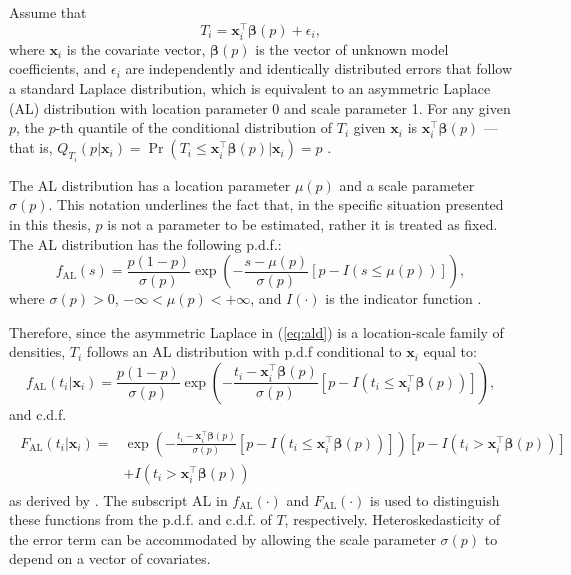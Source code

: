 Assume that
\begin{equation}
T_i = \mathbf{x}_i^\top\boldsymbol{\beta}(p) + \epsilon_i,
\label{eq:laplacemodel}
\end{equation}
where $\mathbf{x}_i$ is the covariate vector, $\boldsymbol{\beta}(p)$ is the vector of unknown model coefficients, and $\epsilon_i$ are independently and identically distributed errors that follow a standard Laplace distribution, which is equivalent to an asymmetric Laplace (AL) distribution with location parameter 0 and scale parameter 1. For any given $p$, the $p$-th quantile of the conditional distribution of $T_i$ given $\mathbf{x}_i$ is $\mathbf{x}_i^\top\boldsymbol{\beta}(p)$ --- that is, $Q_{T_i}(p|\mathbf{x}_i) = \Pr(T_i \le \mathbf{x}_i^\top\boldsymbol{\beta}(p) | \mathbf{x}_i) = p$ \citep{bottai_laplace_2010}.

The AL distribution has a location parameter $\mu(p)$ and a scale parameter $\sigma(p)$. This notation underlines the fact that, in the specific situation presented in this thesis, $p$ is not a parameter to be estimated, rather it is treated as fixed. The AL distribution has the following p.d.f.:
\begin{equation}
f_{\textrm{AL}}\left(s\right) = \frac{p\left(1-p\right)}{\sigma(p)}\exp\left(-\frac{s-\mu(p)}{\sigma(p)}\left[p-I\left(s\le\mu(p)\right)\right] \right),
\label{eq:ald}
\end{equation}
where $\sigma(p)>0$, $-\infty < \mu(p) < +\infty$, and $I(\cdot)$ is the indicator function \citep{yu_threeparameter_2005}.

Therefore, since the asymmetric Laplace in (\ref{eq:ald}) is a location-scale family of densities, $T_i$ follows an AL distribution with p.d.f conditional to $\mathbf{x}_i$ equal to:
\begin{equation}
f_{\textrm{AL}}\left(t_i|\mathbf{x}_i\right) = \frac{p\left(1-p\right)}{\sigma(p)}\exp\left(-\frac{t_i-\mathbf{x}_i^\top\boldsymbol{\beta}(p)}{\sigma(p)}\left[p-I\left(t_i\le\mathbf{x}_i^\top\boldsymbol{\beta}(p)\right)\right] \right),
\label{eq:pdf}
\end{equation}
and c.d.f.
\begin{align}
\begin{split}
F_{\textrm{AL}}\left(t_i|\mathbf{x}_i\right) = &\exp\left(-\frac{t_i-\mathbf{x}_i^\top\boldsymbol{\beta}(p)}{\sigma(p)}\left[p-I\left(t_i\le\mathbf{x}_i^\top\boldsymbol{\beta}(p)\right) \right] \right) \left[p-I\left(t_i>\mathbf{x}_i^\top\boldsymbol{\beta}(p)\right)\right]  \label{eq:cdf} \\  
&+ I\left(t_i>\mathbf{x}_i^\top\boldsymbol{\beta}(p)\right)
\end{split}
\end{align}
as derived by \citet{bottai_laplace_2010}. The subscript AL in $f_{\textrm{AL}}(\cdot)$ and $F_{\textrm{AL}}(\cdot)$ is used to distinguish these functions from the p.d.f. and c.d.f. of $T$, respectively.  Heteroskedasticity of the error term can be accommodated by allowing the scale parameter $\sigma(p)$ to depend on a vector of covariates.

